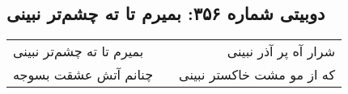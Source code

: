 \begin{center}
\section*{دوبیتی شماره ۳۵۶: بمیرم تا ته چشم‌تر نبینی}
\label{sec:356}
\begin{longtable}{l p{0.5cm} r}
بمیرم تا ته چشم‌تر نبینی
&&
شرار آه پر آذر نبینی
\\
چنانم آتش عشقت بسوجه
&&
که از مو مشت خاکستر نبینی
\\
\end{longtable}
\end{center}
